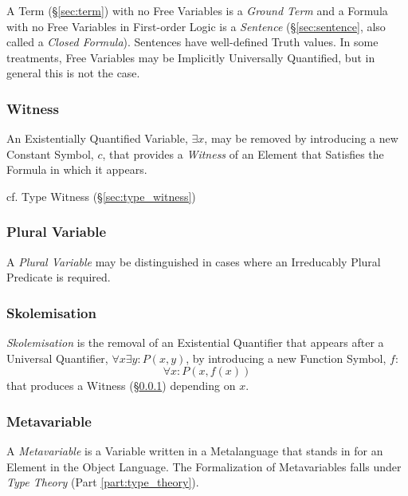 A Term (\S\ref{sec:term}) with no Free Variables is a \emph{Ground
  Term} and a Formula with no Free Variables in First-order Logic is a
\emph{Sentence} (\S\ref{sec:sentence}, also called a \emph{Closed
  Formula}). Sentences have well-defined Truth values. In some
treatments, Free Variables may be Implicitly Universally Quantified,
but in general this is not the case.



\subsubsection{Witness}\label{sec:witness}

An Existentially Quantified Variable, $\exists x$, may be removed by
introducing a new Constant Symbol, $c$, that provides a \emph{Witness}
of an Element that Satisfies the Formula in which it appears.

cf. Type Witness (\S\ref{sec:type_witness})



\subsubsection{Plural Variable}\label{sec:plural_variable}
\cite{laycock10}

A \emph{Plural Variable} may be distinguished in cases where an
Irreducably Plural Predicate is required.



\subsubsection{Skolemisation}\label{sec:skolemisation}

\emph{Skolemisation} is the removal of an Existential Quantifier that
appears after a Universal Quantifier, $\forall x \exists y : P (x,y)$,
by introducing a new Function Symbol, $f$:
\[
  \forall x : P (x, f(x))
\]
that produces a Witness (\S\ref{sec:witness}) depending on $x$.



\subsubsection{Metavariable}\label{sec:metavariable}

A \emph{Metavariable} is a Variable written in a Metalanguage that
stands in for an Element in the Object Language. The Formalization of
Metavariables falls under \emph{Type Theory} (Part
\ref{part:type_theory}).

